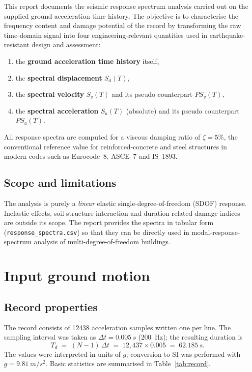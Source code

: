 \documentclass[11pt,a4paper]{article}
\begin{document}
This report documents the seismic response spectrum analysis carried out on the
supplied ground acceleration time history. The objective is to characterise the
frequency content and damage potential of the record by transforming the
raw time-domain signal into four engineering-relevant quantities used in
earthquake-resistant design and assessment:
\begin{enumerate}[leftmargin=1.4em,itemsep=0.15em]
  \item the \textbf{ground acceleration time history} itself,
  \item the \textbf{spectral displacement} $S_d(T)$,
  \item the \textbf{spectral velocity} $S_v(T)$ and its pseudo counterpart $PS_v(T)$,
  \item the \textbf{spectral acceleration} $S_a(T)$ (absolute) and its
        pseudo counterpart $PS_a(T)$.
\end{enumerate}
All response spectra are computed for a viscous damping ratio of
$\zeta = 5\%$, the conventional reference value for reinforced-concrete
and steel structures in modern codes such as Eurocode~8, ASCE~7 and
IS~1893.

\subsection{Scope and limitations}
The analysis is purely a \emph{linear} elastic single-degree-of-freedom
(SDOF) response. Inelastic effects, soil-structure interaction and
duration-related damage indices are outside its scope. The report
provides the spectra in tabular form (\texttt{response\_spectra.csv})
so that they can be directly used in modal-response-spectrum analysis of
multi-degree-of-freedom buildings.

\section{Input ground motion}

\subsection{Record properties}
The record consists of \num{12438} acceleration samples written one per
line. The sampling interval was taken as $\Delta t = \SI{0.005}{s}$
(\SI{200}{Hz}); the resulting duration is
\[
  T_d \;=\; (N-1)\,\Delta t \;=\; 12{,}437 \times 0.005 \;=\; \SI{62.185}{s}.
\]
The values were interpreted in units of $g$; conversion to SI was performed
with $g = \SI{9.81}{m/s^2}$. Basic statistics are summarised in
Table~\ref{tab:record}.
\end{document}
